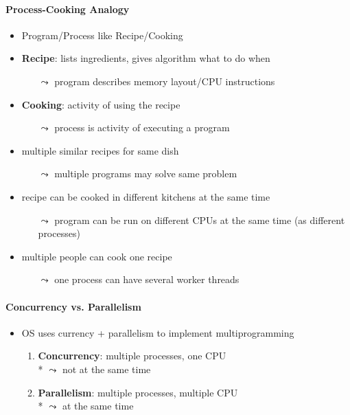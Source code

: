 \paragraph{Process-Cooking Analogy}
\begin{itemize}
	\item Program/Process like Recipe/Cooking
	\item \textbf{Recipe}: lists ingredients, gives algorithm what to do when
	\begin{itemize}
		\item[$ \leadsto $] program describes memory layout/CPU instructions
	\end{itemize}
	\item \textbf{Cooking}: activity of using the recipe
	\begin{itemize}
		\item[$ \leadsto $] process is activity of executing a program
	\end{itemize}
	\item multiple similar recipes for same dish
	\begin{itemize}
		\item[$ \leadsto $] multiple programs may solve same problem
	\end{itemize}
	\item recipe can be cooked in different kitchens at the same time
	\begin{itemize}
		\item[$ \leadsto $] program can be run on different CPUs at the same time (as different processes)
	\end{itemize}
	\item multiple people can cook one recipe
	\begin{itemize}
		\item[$ \leadsto $] one process can have several worker threads
	\end{itemize}
\end{itemize}

\paragraph{Concurrency vs. Parallelism}
\begin{itemize}
	\item OS uses currency + parallelism to implement multiprogramming
	\begin{enumerate}
		\item \textbf{Concurrency}: multiple processes, one CPU \\* \( \leadsto \) not at the same time
		\item \textbf{Parallelism}: multiple processes, multiple CPU \\* \( \leadsto \) at the same time
	\end{enumerate}
\end{itemize}

